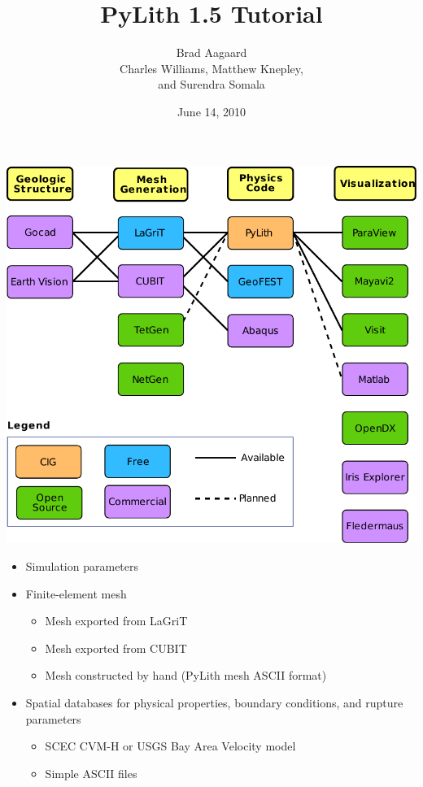 \documentclass[pdftex,cig,slideColor]{pp4slides}
\title{PyLith 1.5 Tutorial}
\subtitle{}
\author{Brad Aagaard\\[10pt]
  Charles Williams, Matthew Knepley,\\
  and Surendra Somala}
\date{June 14, 2010}
\begin{document}
\maketitle


  \vfill
  \begin{center}
    \includegraphics[scale=1.15]{figs/workflow}
  \end{center}
  \vfill



  \begin{itemize}
  \item Simulation parameters
  \item Finite-element mesh
    \begin{itemize}
    \item Mesh exported from LaGriT
    \item Mesh exported from CUBIT
    \item Mesh constructed by hand (PyLith mesh ASCII format)
    \end{itemize}
  \item Spatial databases for physical properties, boundary
    conditions, and rupture parameters
    \begin{itemize}
    \item SCEC CVM-H or USGS Bay Area Velocity model
    \item Simple ASCII files
    \end{itemize}
  \end{itemize}
\end{document}

